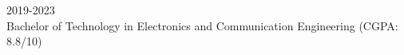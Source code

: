 \hfill 2019-2023\\ {Bachelor of Technology in Electronics and Communication Engineering (CGPA: 8.8/10)} 
